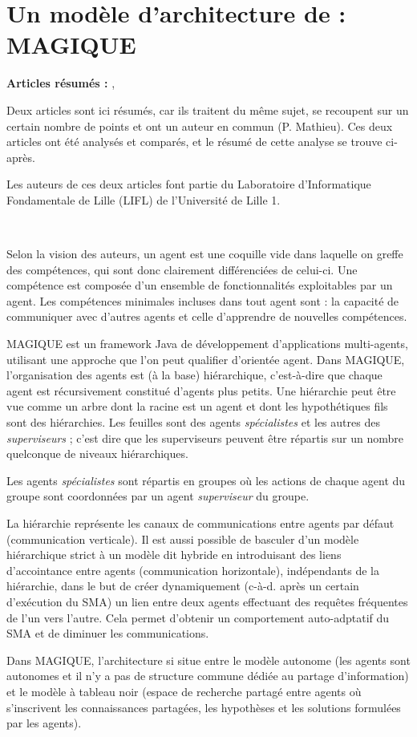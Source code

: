 \section{Un modèle d'architecture de  : MAGIQUE}
\textbf{Articles résumés :} \cite{m1}, \cite{m2}

Deux articles sont ici résumés, car ils traitent du même sujet, se recoupent sur un certain nombre de points et ont un auteur en commun (P. Mathieu). Ces deux articles ont été analysés et comparés, et le résumé de cette analyse se trouve ci-après.



Les auteurs de ces deux articles font partie du Laboratoire d'Informatique Fondamentale de Lille (LIFL) de l'Université de Lille 1.

~

Selon la vision des auteurs, un agent est une \og{}coquille vide\fg{} dans laquelle on greffe des compétences, qui sont donc clairement différenciées de celui-ci. Une compétence est composée d'un ensemble de fonctionnalités exploitables par un agent. Les compétences minimales incluses dans tout agent sont : la capacité de communiquer avec d'autres agents et celle d'apprendre de nouvelles compétences.

MAGIQUE est un framework Java de développement d'applications multi-agents, utilisant une approche que l'on peut qualifier d'\og{}orientée agent\fg{}. Dans MAGIQUE, l'organisation des agents est (à la base) hiérarchique, c'est-à-dire que chaque agent est récursivement constitué d'agents plus petits. Une hiérarchie peut être vue comme un arbre dont la racine est un agent et dont les hypothétiques fils sont des hiérarchies. Les feuilles sont des agents \emph{spécialistes} et les autres des \emph{superviseurs} ; c'est dire que les superviseurs peuvent être répartis sur un nombre quelconque de niveaux hiérarchiques.

Les agents \emph{spécialistes} sont répartis en groupes où les actions de chaque agent du groupe sont coordonnées par un agent \emph{superviseur} du groupe. 

La hiérarchie représente les canaux de communications entre agents par défaut (communication verticale). Il est aussi possible de basculer d'un modèle hiérarchique strict à un modèle dit \og{}hybride\fg{} en introduisant des liens d'\og{}accointance\fg{} entre agents (communication horizontale), indépendants de la hiérarchie, dans le but de créer dynamiquement (c-à-d. après un certain d'exécution du SMA) un lien entre deux agents effectuant des requêtes fréquentes de l'un vers l'autre. Cela permet d'obtenir un comportement auto-adptatif du SMA et de diminuer les communications.

Dans MAGIQUE, l'architecture si situe entre le modèle autonome (les agents sont autonomes et il n'y a pas de structure commune dédiée au partage d'information) et le modèle à tableau noir (espace de recherche partagé entre agents où s'inscrivent les connaissances partagées, les hypothèses et les solutions formulées par les agents).


